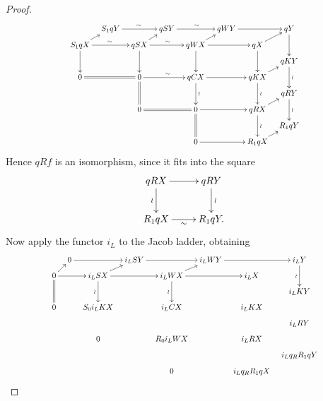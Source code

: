 \begin{proof}
\[\label{q.of.Jacob}
\scalebox{.8}{ 
\xymatrix@R=2mm@C=3mm{
    & S_1 q Y &   & q SY  &   & q WY  &   & q Y \\
  S_1 qX  &   & q SX  &   & q WX  &   & q X \\
    &   &   &   &   &   &   & q KY \\
  0 &   & 0 &   & q CX  &   & q KX \\
    &   &   &   &   &   &   & q RY \\
    &   & 0 &   & 0 &   & qRX \\
    &   &   &   &   &   &   & R_1 qY \\
    &   &   &   & 0 &   & R_1 qX
  \ar^\sim "1,2";"1,4" 
  \ar^\sim "1,4";"1,6" 
  \ar "1,6";"1,8" 
  \ar "1,8";"3,8" 
  \ar "2,1";"1,2" 
  \ar^\sim "2,1";"2,3" 
  \ar "2,1";"4,1" 
  \ar "2,3";"1,4" 
  \ar^\sim "2,3";"2,5" 
  \ar "2,3";"4,3" 
  \ar "2,5";"1,6" 
  \ar "2,5";"2,7" 
  \ar "2,5";"4,5" 
  \ar "2,7";"4,7" 
  \ar "2,7";"1,8" 
  \ar^\wr "3,8";"5,8" 
  \ar@{=} "4,1";"4,3" 
  \ar@{=} "4,3";"6,3" 
  \ar^\sim "4,3";"4,5" 
  \ar^\wr "4,5";"6,5" 
  \ar "4,5";"4,7" 
  \ar^\wr "4,7";"6,7" 
  \ar "4,7";"3,8" 
  \ar^\wr "5,8";"7,8" 
  \ar@{=} "6,3";"6,5" 
  \ar "6,5";"6,7" 
  \ar@{=} "6,5";"8,5" 
  \ar^\wr "6,7";"8,7" 
  \ar "6,7";"5,8" 
  \ar "8,5";"8,7" 
  \ar "8,7";"7,8" 
}}
\] 
Hence $qRf$ is an isomorphism, since it fits into the square
\[
  \xymatrix{
    q R X & q R Y \\
    R_1 q X & R_1 q Y.
    \ar "1,1";"1,2" 
    \ar_\wr "1,1";"2,1" 
    \ar^\wr "1,2";"2,2" 
    \ar_\sim "2,1";"2,2" 
  }
\] 
Now apply the functor $i_L$ to the Jacob ladder, obtaining 
\[ 
\label{diag1bis}
\scalebox{.8}{
\xymatrix@R=2mm@C=3mm{
    & 0 &   & i_L SY  &   & i_L WY  &   & i_L Y \\
  0 &   & i_L SX  &   & i_L WX  &   & i_L X \\
    &   &   &   &   &   &   & i_L KY \\
  0 &   & S_0 i_L KX  &   & i_L CX  &   & i_L KX \\
    &   &   &   &   &   &   & i_L RY \\
    &   & 0 &   & R_0 i_L WX  &   & i_L RX \\
    &   &   &   &   &   &   &i_Lq_R R_1 qY \\
    &   &   &   & 0 &   & i_Lq_R R_1 qX
  \ar "1,2";"1,4" 
  \ar "1,4";"1,6" 
  \ar "1,6";"1,8" 
  \ar_\wr "1,8";"3,8" 
  \ar "2,1";"2,3"
   \ar "2,1";"1,2" 
  \ar@{=} "2,1";"4,1" 
  \ar "2,3";"2,5" 
  \ar_\wr "2,3";"4,3" 
  \ar "2,3";"1,4" 
  \ar "2,5";"2,7" 
  \ar_\wr "2,5";"4,5" 
  \ar "2,5";"1,6" 
}}\]
\end{proof}
